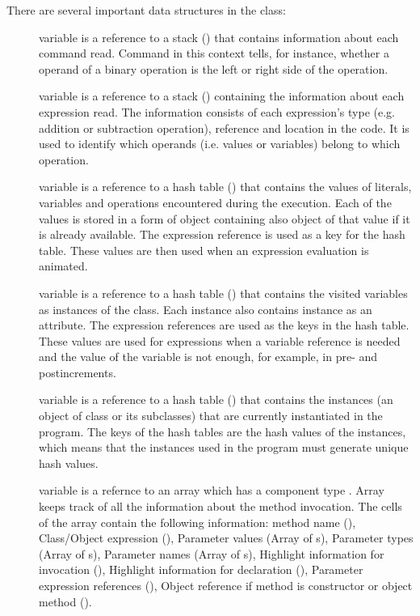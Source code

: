 There are several important data structures in the  class:
\begin{description}

\item[] variable is a reference to a stack () that contains information about each command read. Command in this context tells, for instance, whether a operand of a binary operation is the left or right side of the operation.

\item[] variable is a reference to a stack () containing the information about each expression read. The information consists of each expression's type (e.g. addition or subtraction operation), reference and location in the code. It is used to identify which operands (i.e. values or variables) belong to which operation.

\item[] variable is a reference to a hash table () that contains the values of literals, variables and operations encountered during the execution. Each of the values is stored in a form of  object containing also  object of that value if it is already available. The expression reference is used as a key for the hash table. These values are then used when an expression evaluation is animated.

\item[] variable is a reference to a hash table () that contains the visited variables as instances of the  class. Each instance also contains  instance as an attribute. The expression references are used as the keys in the hash table. These values are used for expressions when a variable reference is needed and the value of the variable is not enough, for example, in pre- and postincrements.

\item[] variable is a reference to a hash table () that contains the instances (an object of  class or its subclasses) that are currently instantiated in the program. The keys of the hash tables are the hash values of the instances, which means that the instances used in the program must generate unique hash values.

\item[] variable is a refernce to an array which has a component type . Array  keeps track of all the information about the method invocation. The cells of the array contain the following information: method name (), Class/Object expression (), Parameter values (Array of s), Parameter types (Array of s), Parameter names (Array of s), Highlight information for invocation (), Highlight information for declaration (), Parameter expression references (), Object reference if method is constructor or object method ().


\end{description}
